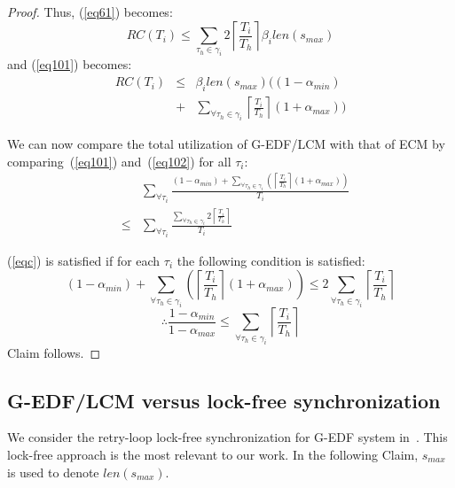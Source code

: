 \documentclass[conference]{IEEEtran}
\begin{document}
\begin{proof}
Thus, (\ref{eq61}) becomes:
\begin{equation}
RC(T_{i})\le\sum_{\tau_{h}\in\gamma_{i}}2\left\lceil\frac{T_{i}}{T_{h}}\right\rceil\beta_{i}len(s_{max})
\label{eq63}\end{equation}
and (\ref{eq101}) becomes:
\begin{eqnarray}
RC(T_{i}) & \le & \beta_{i}len(s_{max}) \Bigg((1-\alpha_{min})\nonumber\\
& + & \sum_{\forall \tau_h \in \gamma_i}\left\lceil\frac{T_{i}}{T_{h}}\right\rceil(1+\alpha_{max})\Bigg)
\label{eq102}\end{eqnarray}

We can now compare the total utilization of G-EDF/LCM with that of ECM by comparing~(\ref{eq101}) and~(\ref{eq102}) for all $\tau_i$:
\begin{eqnarray}
& & \sum_{\forall \tau_{i}}\frac{(1-\alpha_{min})+\sum_{\forall \tau_{h}\in\gamma_{i}}\left(\left\lceil\frac{T_{i}}{T_{h}}\right\rceil(1+\alpha_{max})\right)}{T_{i}} \nonumber\\
& \le &   \sum_{\forall \tau_{i}}\frac{\sum_{\forall \tau_{h}\in\gamma_{i}}2\left\lceil\frac{T_{i}}{T_{h}}\right\rceil}{T_{i}}\label{eqc}\end{eqnarray}

(\ref{eqc}) is satisfied if for each $\tau_{i}$ the following condition is satisfied:
\begin{equation*}
(1-\alpha_{min})+\sum_{\forall \tau_h \in \gamma_i}\left(\left\lceil\frac{T_{i}}{T_{h}}\right\rceil(1+\alpha_{max})\right)  \le  2\sum_{\forall \tau_h \in \gamma_i}\left\lceil\frac{T_{i}}{T_{h}}\right\rceil
\end{equation*}
\begin{equation*}
\therefore\frac{1-\alpha_{min}}{1-\alpha_{max}}  \le  \sum_{\forall \tau_h \in \gamma_i}\left\lceil\frac{T_{i}}{T_{h}}\right\rceil
\end{equation*}
Claim follows.
\end{proof}

\subsection{G-EDF/LCM versus lock-free synchronization}
\label{gedf-lcm-lock-free}
We consider the retry-loop lock-free synchronization for G-EDF system in~\cite{key-5}. This lock-free approach is the most relevant to our work. In the following Claim, $s_{max}$ is used to denote $len(s_{max})$.
\end{document}
